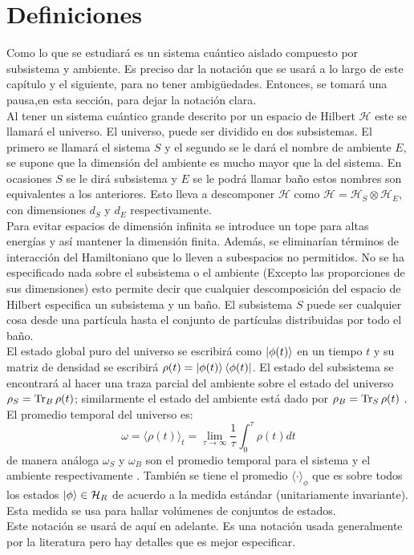 \section{Definiciones}
Como lo que se estudiará es un sistema cuántico aislado compuesto por subsistema y ambiente. Es preciso dar la notación que se usará a lo largo de este capítulo y el siguiente, para no tener ambigüedades. Entonces, se tomará una pausa,en esta sección, para dejar la notación clara.
\\
Al tener un sistema cuántico grande descrito por un espacio de Hilbert $\mathcal{H}$ este se llamará el universo. El universo, puede ser dividido en dos subsistemas. El primero se llamará el sistema $S$  y el segundo se le dará el nombre de ambiente $E$, se supone que la dimensión del ambiente es mucho mayor que la del sistema. En ocasiones $S$ se le dirá subsistema y $E$ se le podrá llamar baño estos nombres son equivalentes a los anteriores. Esto lleva a descomponer $\mathcal{H}$ como $\mathcal{H}=\mathcal{H}_{S} \otimes \mathcal{H}_{E}$, con dimensiones $d_{S}$ y $d_{E}$ respectivamente. 
\\
Para evitar espacios de dimensión infinita se introduce un tope para altas energías y así mantener la dimensión finita. Además, se eliminarían términos de interacción del Hamiltoniano que lo lleven a subespacios no permitidos.  No se ha especificado nada sobre el subsistema o el ambiente (Excepto las proporciones de sus dimensiones)  esto permite decir que cualquier descomposición del espacio de Hilbert especifica un subsistema y un baño. El subsistema $S$ puede ser cualquier cosa desde una partícula hasta el conjunto de partículas distribuidas por todo el baño.
\\
El estado global puro del universo se escribirá como $\ket{\phi(t)}$ en un tiempo $t$ y su matriz de densidad se escribirá $\rho(t)=\ket{\phi(t)}\bra{\phi(t)}$. El estado del subsistema se encontrará al hacer una traza parcial del ambiente sobre el estado del universo $\rho_{S}= \Tr _{B} \rho(t)$; similarmente el estado del ambiente está dado por $\rho_{B}=\Tr _{S} \rho(t)$ \cite{WildeInformation}. 
\\
El promedio temporal del universo es:
\begin{equation}
\omega= \langle \rho(t) \rangle_{t}= \lim_{\tau \to \infty} \frac{1}{\tau} \int_{0}^{\tau} \rho (t)dt
\end{equation}
de manera análoga $\omega_{S}$ y $\omega_{B}$ son el promedio temporal para el sistema y el ambiente respectivamente \cite{TodaStat}. También se tiene el promedio $\langle \cdot \rangle_{\phi}$ que es sobre todos los estados $\ket{\phi} \in \mathcal{H}_{R}$ de acuerdo a la medida estándar (unitariamente invariante). Esta medida se usa para hallar volúmenes de conjuntos de estados.
\\
Este notación se usará de aquí en adelante. Es una notación usada generalmente por la literatura pero hay detalles que es mejor especificar.
